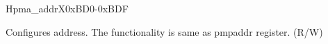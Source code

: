 \begin{register}{H}{pma\_addrX}{0xBD0-0xBDF}
\label{regdesc:pma_addrX}
%
\regnewline%
\begin{regdesc}
\begin{reglist}
\label{fielddesc:ADDR}\item [ADDR] Configures address. The functionality is same as pmpaddr register. (R/W)
\end{reglist}
\end{regdesc}
\end{register}
